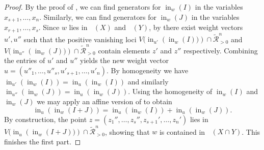 \documentclass{article}
\theoremstyle{definition}
\DeclareMathOperator{\initial}{in}
\DeclareMathOperator{\Tropw}{Trop_\mathcal{C}^+}
\begin{document}
\begin{proof}
    By the proof of \cite[Theorem 3.3.8]{maclagan2015introduction}, we can find generators for $\initial_{ w} ( I)$ in the variables $x_{s+1}, \dots, x_{n}$. Similarly, we can find generators for $\initial_{ w}  (J)$ in the variables $x_{r+1}, \dots, x_s$.
    Since ${w}$ lies in $\Tropw( X)$ and $\Tropw( Y)$, by  there exist weight vectors $u', u''$ such that the positive vanishing loci
    $V(\initial_{u'} \left( \initial_{ w}  (I)) \right) \cap \widetilde{\mathcal{R}}^n_{>0}$ and $V(\initial_{u''}  \left( \initial_{ w} ( J)) \right) \cap \widetilde{\mathcal{R}}^n_{>0}$ contain elements $z'$ and $z''$ respectively. Combining the entries of $u'$ and $u''$ yields the new weight vector ${u} = (u''_{1}, \dots, u''_{s}, u'_{s+1}, \dots, u'_{n})$. By homogeneity we have $ \initial_{u'} \left( \initial_{ w}  (I) \right) = \initial_{{u}}  \left( \initial_{ w}  (I) \right)$ and similarly 
    $\initial_{u''} \left( \initial_{ w}  (J) \right) = \initial_{{u}} \left( \initial_{ w} ( J) \right)$.
    Using the homogeneity of $\initial_{{w}}  (I)$ and $\initial_{{w}} ( J)$ we may apply an affine version of \cite[Lemma 3.4.10]{maclagan2015introduction} to obtain
    \[
    \initial_{{u}} \left( \initial_{{w}} ( I +  J) \right)
     =     \initial_{{u}}\left(\initial_{{w}} ( I ) \right)+ 
        \initial_{{u}}\left( \initial_{{w}} ( J) \right).
    \]
    By construction, the point $z = (z_1'', \dots, z_s'', z_{s+1}', \dots, z_n')$ lies in $V(\initial_{{u}} \left( \initial_{ w}( I +  J)) \right) \cap \widetilde{\mathcal{R}}^n_{>0}$, showing
    that $w$ is contained in $\Tropw({X} \cap {Y})$. This finishes the first part.
    

\end{proof}
\end{document}
